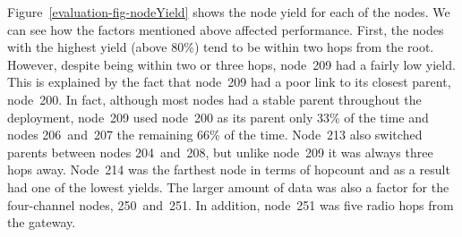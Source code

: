 Figure~\ref{evaluation-fig-nodeYield} shows the node yield for each of the
nodes.  We can see how the factors mentioned above affected performance.
First, the nodes with the highest yield (above 80\%) tend to be within two
hops from the root. However, despite being within two or three hops, node~209
had a fairly low yield.  This is explained by the fact that node~209 had a
poor link to its closest parent, node~200.  In fact, although most nodes had
a stable parent throughout the deployment, node~209 used node~200 as its
parent only 33\% of the time and nodes 206~and~207 the remaining 66\% of the
time.  Node~213 also switched parents between nodes 204~and~208, but unlike
node~209 it was always three hops away.  Node~214 was the farthest node in
terms of hopcount and as a result had one of the lowest yields.  The larger
amount of data was also a factor for the four-channel nodes, 250~and~251. In
addition, node~251 was five radio hops from the gateway.




